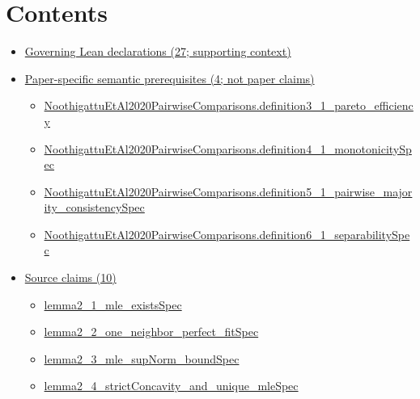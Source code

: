 \documentclass[10pt]{article}
\begin{document}
\section*{Contents}
\begin{itemize}[leftmargin=1.2em]
\item \hyperlink{governing-declaration-section-5ef5ef0364b6939c}{Governing Lean declarations (27; supporting context)}
\item \hyperlink{paper-prerequisite-section-5ef5ef0364b6939c}{Paper-specific semantic prerequisites (4; not paper claims)}
\begin{itemize}[leftmargin=1.2em]
\item \hyperlink{paper-prerequisite-07405caa9661e20f}{Noothigattu\allowbreak{}Et\allowbreak{}Al2020\allowbreak{}Pairwise\allowbreak{}Comparisons.\allowbreak{}definition3\_\allowbreak{}1\_\allowbreak{}pareto\_\allowbreak{}efficiency}
\item \hyperlink{paper-prerequisite-01e3b5f8d1238d2d}{Noothigattu\allowbreak{}Et\allowbreak{}Al2020\allowbreak{}Pairwise\allowbreak{}Comparisons.\allowbreak{}definition4\_\allowbreak{}1\_\allowbreak{}monotonicity\allowbreak{}Spec}
\item \hyperlink{paper-prerequisite-0eba3734667d4efb}{Noothigattu\allowbreak{}Et\allowbreak{}Al2020\allowbreak{}Pairwise\allowbreak{}Comparisons.\allowbreak{}definition5\_\allowbreak{}1\_\allowbreak{}pairwise\_\allowbreak{}majority\_\allowbreak{}consistency\allowbreak{}Spec}
\item \hyperlink{paper-prerequisite-eddfe1e162a942bc}{Noothigattu\allowbreak{}Et\allowbreak{}Al2020\allowbreak{}Pairwise\allowbreak{}Comparisons.\allowbreak{}definition6\_\allowbreak{}1\_\allowbreak{}separability\allowbreak{}Spec}
\end{itemize}
\item \hyperlink{source-section-f10b5f68e4acf3dc}{Source claims (10)}
\begin{itemize}[leftmargin=1.2em]
\item \hyperlink{source-claim-a399fdd5be732a4d}{lemma2\_\allowbreak{}1\_\allowbreak{}mle\_\allowbreak{}exists\allowbreak{}Spec}
\item \hyperlink{source-claim-54fc19f0aa38d1c6}{lemma2\_\allowbreak{}2\_\allowbreak{}one\_\allowbreak{}neighbor\_\allowbreak{}perfect\_\allowbreak{}fit\allowbreak{}Spec}
\item \hyperlink{source-claim-f4e00b752a4932aa}{lemma2\_\allowbreak{}3\_\allowbreak{}mle\_\allowbreak{}sup\allowbreak{}Norm\_\allowbreak{}bound\allowbreak{}Spec}
\item \hyperlink{source-claim-45a27951c21eefad}{lemma2\_\allowbreak{}4\_\allowbreak{}strict\allowbreak{}Concavity\_\allowbreak{}and\_\allowbreak{}unique\_\allowbreak{}mle\allowbreak{}Spec}

\end{itemize}
\end{itemize}
\end{document}
